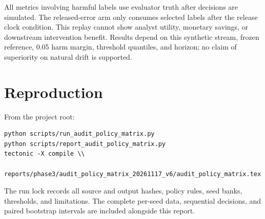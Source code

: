 \documentclass[10pt]{article}
\begin{document}
All metrics involving harmful labels use evaluator truth after decisions are simulated. The released-error arm only consumes selected labels after the release clock condition. This replay cannot show analyst utility, monetary savings, or downstream intervention benefit. Results depend on this synthetic stream, frozen reference, 0.05 harm margin, threshold quantiles, and horizon; no claim of superiority on natural drift is supported.
\section{Reproduction}
From the project root:
\begin{verbatim}
python scripts/run_audit_policy_matrix.py
python scripts/report_audit_policy_matrix.py
tectonic -X compile \\
  reports/phase3/audit_policy_matrix_20261117_v6/audit_policy_matrix.tex
\end{verbatim}
The run lock records all source and output hashes, policy rules, seed banks, thresholds, and limitations. The complete per-seed data, sequential decisions, and paired bootstrap intervals are included alongside this report.
\end{document}
